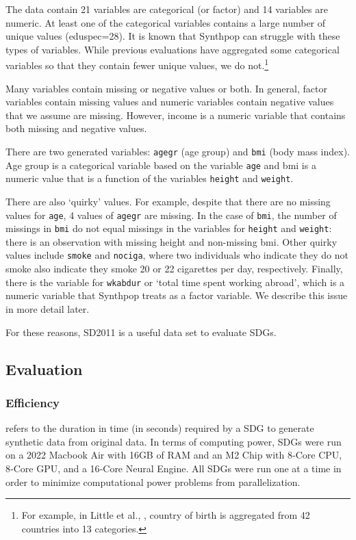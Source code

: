 \documentclass[runningheads]{llncs}
\begin{document}
The data contain 21 variables are categorical (or factor) and 14 variables are numeric.  At least one of the categorical variables contains a large number of unique values (eduspec=28).  It is known that Synthpop can struggle with these types of variables.  While previous evaluations have aggregated some categorical variables so that they contain fewer unique values, we do not.\footnote{For example, in Little et al., \cite{little2021generative}, country of birth is aggregated from 42 countries into 13 categories.}

Many variables contain missing or negative values or both.  In general, factor variables contain missing values and numeric variables contain negative values that we assume are missing.  However, income is a numeric variable that contains both missing and negative values.  

There are two generated variables: \texttt{agegr} (age group) and \texttt{bmi} (body mass index).  Age group is a categorical variable based on the variable \texttt{age} and bmi is a numeric value that is a function of the variables \texttt{height} and \texttt{weight}.  

There are also `quirky' values.  For example, despite that there are no missing values for \texttt{age}, 4 values of \texttt{agegr} are missing.  In the case of \texttt{bmi}, the number of missings in \texttt{bmi} do not equal missings in the variables for \texttt{height} and \texttt{weight}: there is an observation with missing height and non-missing bmi.  Other quirky values include \texttt{smoke} and \texttt{nociga}, where two individuals who indicate they do not smoke also indicate they smoke 20 or 22 cigarettes per day, respectively.  Finally, there is the variable for \texttt{wkabdur} or `total time spent working abroad', which is a numeric variable that Synthpop treats as a factor variable.  We describe this issue in more detail later.

For these reasons, SD2011 is a useful data set to evaluate SDGs.  

\subsection{Evaluation}

\subsubsection{Efficiency} refers to the duration in time (in seconds) required by a SDG to generate synthetic data from original data.  In terms of computing power, SDGs were run on a 2022 Macbook Air with 16GB of RAM and an M2 Chip with 8‑Core CPU, 8‑Core GPU, and a 16‑Core Neural Engine.  All SDGs were run one at a time in order to minimize computational power problems from parallelization.
\end{document}
